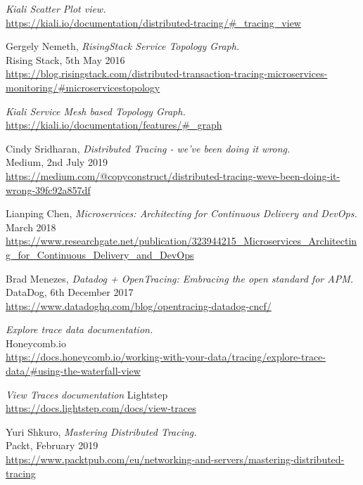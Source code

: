\documentclass[pdftex,titlepage]{article}
\begin{document}
\begin{thebibliography}{20}
        \textit{Kiali Scatter Plot view.} \\
        \url{https://kiali.io/documentation/distributed-tracing/#_tracing_view}

        Gergely Nemeth, \textit{RisingStack Service Topology Graph.} \\
        Rising Stack, 5th May 2016 \\
        \url{https://blog.risingstack.com/distributed-transaction-tracing-microservices-monitoring/#microservicestopology}

        \textit{Kiali Service Mesh based Topology Graph.} \\
        \url{https://kiali.io/documentation/features/#_graph}

        Cindy Sridharan, \textit{Distributed Tracing - we've been doing it wrong.} \\
        Medium, 2nd July 2019 \\
        \url{https://medium.com/@copyconstruct/distributed-tracing-weve-been-doing-it-wrong-39fc92a857df}

        Lianping Chen, \textit{Microservices: Architecting for Continuous Delivery and DevOps.} \\
        March 2018 \\
        \url{https://www.researchgate.net/publication/323944215_Microservices_Architecting_for_Continuous_Delivery_and_DevOps}

        Brad Menezes, \textit{Datadog + OpenTracing: Embracing the open standard for APM.} \\
        DataDog, 6th December 2017 \\
        \url{https://www.datadoghq.com/blog/opentracing-datadog-cncf/}

        \textit{Explore trace data documentation.} \\
        Honeycomb.io \\
        \url{https://docs.honeycomb.io/working-with-your-data/tracing/explore-trace-data/#using-the-waterfall-view}

        \textit{View Traces documentation}
        Lightstep \\ 
        \url{https://docs.lightstep.com/docs/view-traces}

        Yuri Shkuro, \textit{Mastering Distributed Tracing.} \\
        Packt, February 2019 \\
        \url{https://www.packtpub.com/eu/networking-and-servers/mastering-distributed-tracing}
    \end{thebibliography}
\end{document}
